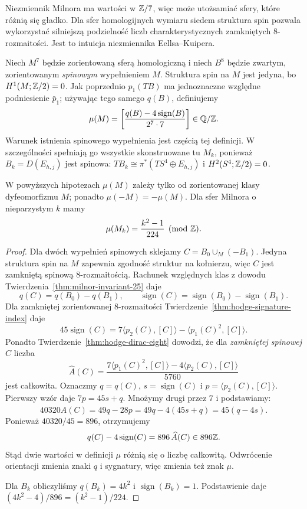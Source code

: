 Niezmiennik Milnora ma wartości w $\mathbb{Z}/7$,
więc może utożsamiać sfery, które różnią
się gładko. Dla sfer homologijnych wymiaru
siedem struktura spin pozwala wykorzystać
silniejszą podzielność liczb
charakterystycznych zamkniętych
$8$-rozmaitości. Jest to intuicja
niezmiennika Eellsa--Kuipera.

Niech $M^7$ będzie zorientowaną sferą
homologiczną i niech $B^8$ będzie zwartym,
zorientowanym \emph{spinowym} wypełnieniem
$M$. Struktura spin na $M$ jest jedyna,
bo $H^1(M;\mathbb{Z}/2)=0$. Jak poprzednio
$p_1(TB)$ ma jednoznaczne względne
podniesienie $\bar p_1$; używając
tego samego $q(B)$, definiujemy
\[
 \mu(M)=
 \left[\frac{q(B)-4\operatorname{sign}(B)}
                 {2^7\cdot7}\right]\in\mathbb{Q}/\mathbb{Z}.
\]
Warunek istnienia spinowego wypełnienia
jest częścią tej definicji. W szczególności
spełniają go wszystkie skonstruowane tu
$M_k$, ponieważ $B_k=D(E_{h,j})$ jest
spinowa: $TB_k\cong
\pi^*(TS^4\oplus E_{h,j})$ i
$H^2(S^4;\mathbb{Z}/2)=0$.

\begin{stwierdzenie}
\label{prop:eells-kuiper-Milnor-25}
W powyższych hipotezach $\mu(M)$ zależy
tylko od zorientowanej klasy
dyfeomorfizmu $M$; ponadto
$\mu(-M)=-\mu(M)$.
Dla sfer Milnora o nieparzystym $k$ mamy
\[
 \mu(M_k)=\frac{k^2-1}{224}\pmod{\mathbb{Z}}.
\]
\end{stwierdzenie}
\begin{proof}
Dla dwóch wypełnień spinowych sklejamy
$C=B_0\cup_M(-B_1)$. Jedyna struktura
spin na $M$ zapewnia zgodność struktur
na kołnierzu, więc $C$ jest zamkniętą
spinową $8$-rozmaitością.
Rachunek względnych klas z dowodu
Twierdzenia~\ref{thm:milnor-invariant-25}
daje
\[
 q(C)=q(B_0)-q(B_1),\qquad
 \operatorname{sign}(C)=
 \operatorname{sign}(B_0)
 -\operatorname{sign}(B_1).
\]
Dla zamkniętej zorientowanej
$8$-rozmaitości
Twierdzenie~\ref{thm:hodge-signature-index}
daje
\[
 45\operatorname{sign}(C)
   =7\langle p_2(C),[C]\rangle
      -\langle p_1(C)^2,[C]\rangle.
\]
Ponadto Twierdzenie~\ref{thm:hodge-dirac-eight}
dowodzi, że dla \emph{zamkniętej
spinowej} $C$ liczba
\[
 \widehat A(C)=
 \frac{7\langle p_1(C)^2,[C]\rangle
       -4\langle p_2(C),[C]\rangle}
      {5760}
\]
jest całkowita. Oznaczmy $q=q(C)$, $s=\operatorname{sign}(C)$
i $p=\langle p_2(C),[C]\rangle$. Pierwszy wzór daje
$7p=45s+q$. Mnożymy drugi przez $7$ i podstawiamy:
\[
 40320\widehat A(C)=49q-28p
 =49q-4(45s+q)=45(q-4s).
\]
Ponieważ $40320/45=896$, otrzymujemy
\[
 q(C)-4\operatorname{sign}(C)
   =896\,\widehat A(C)\in896\mathbb{Z}.
\]
Stąd dwie wartości w definicji $\mu$
różnią się o liczbę całkowitą.
Odwrócenie orientacji zmienia znaki
$q$ i sygnatury, więc zmienia też
znak $\mu$.

Dla $B_k$ obliczyliśmy
$q(B_k)=4k^2$ i
$\operatorname{sign}(B_k)=1$.
Podstawienie daje
$(4k^2-4)/896=(k^2-1)/224$.
\end{proof}

